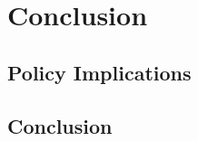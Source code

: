 
\chapter{Conclusion} %

\label{Chapter6} %


\section{Policy Implications}






\section{Conclusion}

